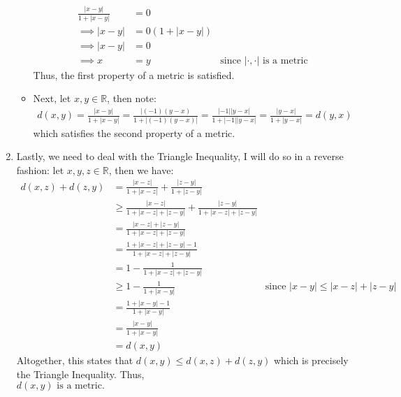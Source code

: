 \documentclass[10pt,a4paper]{article}
\theoremstyle{definition}
\theoremstyle{definition}
\begin{document}
\begin{enumerate}[label = (\alph*)]
\begin{itemize}
\begin{align*}
	\frac{|x - y|}{1 + |x - y|} &= 0\\
	\implies |x - y| &= 0(1 + |x - y|)\\
	\implies |x - y| &= 0\\
	\implies x &= y &\text{since $|\cdot, \cdot |$ is a metric}
	\end{align*}
	Thus, the first property of a metric is satisfied. 
	\item Next, let $x, y \in \mathbb{R}$, then note:
	\begin{align*}
	d(x, y) = \frac{|x - y|}{1 + |x - y|} = \frac{|(-1)(y - x)}{1 + |(-1)(y - x)|} = \frac{|-1||y - x|}{1 + |-1||y - x|} = \frac{|y - x|}{1 + |y - x|} = d(y, x)
	\end{align*}
	which satisfies the second property of a metric. 
	\end{itemize}
	\item Lastly, we need to deal with the Triangle Inequality, I will do so in a reverse fashion: let $x, y, z \in \mathbb{R}$, then we have:
	\begin{align*}
	d(x, z) + d(z, y) &= \frac{|x - z|}{1 + |x - z|} + \frac{|z - y|}{1 + |z - y|}\\
	&\geq \frac{|x - z|}{1 + |x - z| + |z - y|} + \frac{|z - y|}{1 + |x - z| + |z - y|}\\
	&= \frac{|x - z| + |z - y|}{1 + |x - z| + |z - y|}\\
	&= \frac{1 + |x - z| + |z - y| - 1}{1 + |x - z| + |z - y|}\\
	&= 1 - \frac{1}{1 + |x - z| + |z - y|}\\
	&\geq 1 - \frac{1}{1 + |x - y|} &\text{since $|x - y| \leq |x - z| + |z - y|$}\\
	&= \frac{1 + |x - y| - 1}{1 + |x - y|}\\
	&= \frac{|x - y|}{1 + |x - y|}\\
	&= d(x, y)
	\end{align*}
	Altogether, this states that $d(x, y) \leq d(x,z) + d(z, y)$ which is precisely the Triangle Inequality. Thus, \\$\boxed{d(x, y) \text{ is a metric.}}$
\end{enumerate}
\end{document}
